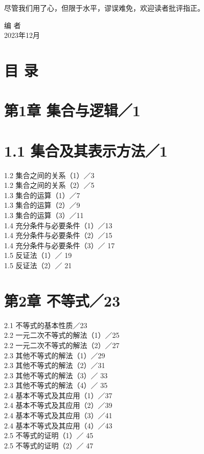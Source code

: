 \documentclass[10pt]{article}
\begin{document}
尽管我们用了心，但限于水平，谬误难免，欢迎读者批评指正。

编 者\\
2023年12月

\section*{目 录}
\section*{第1章 集合与逻辑／1}
\section*{1.1 集合及其表示方法／1}
1.2 集合之间的关系（1）／3\\
1.2 集合之间的关系（2）／5\\
1.3 集合的运算（1）／7\\
1.3 集合的运算（2）／9\\
1.3 集合的运算（3）／11\\
1.4 充分条件与必要条件（1）／13\\
1.4 充分条件与必要条件（2）／15\\
1.4 充分条件与必要条件（3）／ 17\\
1.5 反证法（1）／ 19\\
1.5 反证法（2）／ 21

\section*{第2章 不等式／23}
2.1 不等式的基本性质／23\\
2.2 一元二次不等式的解法（1）／25\\
2.2 一元二次不等式的解法（2）／27\\
2.3 其他不等式的解法（1）／29\\
2.3 其他不等式的解法（2）／31\\
2.3 其他不等式的解法（3）／ 33\\
2.3 其他不等式的解法（4）／ 35\\
2.4 基本不等式及其应用（1）／37\\
2.4 基本不等式及其应用（2）／39\\
2.4 基本不等式及其应用（3）／41\\
2.4 基本不等式及其应用（4）／43\\
2.5 不等式的证明（1）／ 45\\
2.5 不等式的证明（2）／ 47
\end{document}
